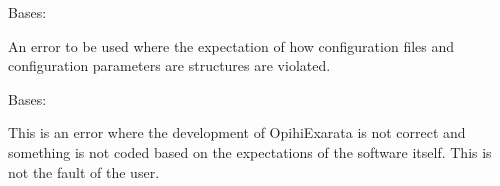 \documentclass[letterpaper,11pt,english]{sphinxmanual}
\begin{document}

\begin{savenotes}\begin{fulllineitems}
\label{\detokenize{code/opihiexarata.library.error:opihiexarata.library.error.ConfigurationError}}
\pysigstartsignatures
{}
\pysigstopsignatures
\sphinxAtStartPar
Bases: {\hyperref[\detokenize{code/opihiexarata.library.error:opihiexarata.library.error.ExarataException}]{}}

\sphinxAtStartPar
An error to be used where the expectation of how configuration files
and configuration parameters are structures are violated.

\end{fulllineitems}\end{savenotes}


\begin{savenotes}\begin{fulllineitems}
\label{\detokenize{code/opihiexarata.library.error:opihiexarata.library.error.DevelopmentError}}
\pysigstartsignatures
{}
\pysigstopsignatures
\sphinxAtStartPar
Bases: {\hyperref[\detokenize{code/opihiexarata.library.error:opihiexarata.library.error.ExarataBaseException}]{}}

\sphinxAtStartPar
This is an error where the development of OpihiExarata is not correct and
something is not coded based on the expectations of the software itself.
This is not the fault of the user.

\end{fulllineitems}\end{savenotes}
\end{document}
